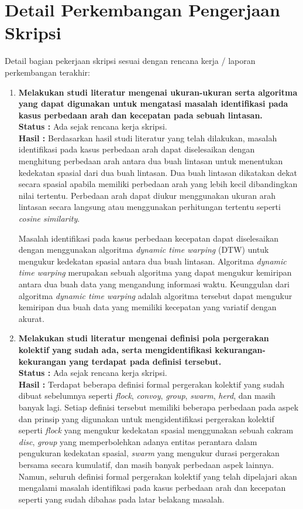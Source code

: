 \documentclass[a4paper,twoside]{article}
\begin{document}
\section{Detail Perkembangan Pengerjaan Skripsi}
Detail bagian pekerjaan skripsi sesuai dengan rencana kerja / laporan perkembangan terakhir:
	\begin{enumerate}
		\item \textbf{Melakukan studi literatur mengenai ukuran-ukuran serta algoritma yang dapat digunakan untuk mengatasi masalah identifikasi pada kasus perbedaan arah dan kecepatan pada sebuah lintasan.} \\
		{\bf Status :} Ada sejak rencana kerja skripsi.\\
		{\bf Hasil :} Berdasarkan hasil studi literatur yang telah dilakukan, masalah identifikasi pada kasus perbedaan arah dapat diselesaikan dengan menghitung perbedaan arah antara dua buah lintasan untuk menentukan kedekatan spasial dari dua buah lintasan. Dua buah lintasan dikatakan dekat secara spasial apabila memiliki perbedaan arah yang lebih kecil dibandingkan nilai tertentu. Perbedaan arah dapat diukur menggunakan ukuran arah lintasan secara langsung atau menggunakan perhitungan tertentu seperti \textit{cosine similarity}.
		
		Masalah identifikasi pada kasus perbedaan kecepatan dapat diselesaikan dengan menggunakan algoritma \textit{dynamic time warping} (DTW) untuk mengukur kedekatan spasial antara dua buah lintasan. Algoritma \textit{dynamic time warping} merupakan sebuah algoritma yang dapat mengukur kemiripan antara dua buah data yang mengandung informasi waktu. Keunggulan dari algoritma \textit{dynamic time warping} adalah algoritma tersebut dapat mengukur kemiripan dua buah data yang memiliki kecepatan yang variatif dengan akurat.
		\\
		
		\item \textbf{Melakukan studi literatur mengenai definisi pola pergerakan kolektif yang sudah ada, serta mengidentifikasi kekurangan-kekurangan yang terdapat pada definisi tersebut.}\\
		{\bf Status :} Ada sejak rencana kerja skripsi.\\
		{\bf Hasil :} Terdapat beberapa definisi formal pergerakan kolektif yang sudah dibuat sebelumnya seperti \textit{flock}, \textit{convoy}, \textit{group}, \textit{swarm}, \textit{herd}, dan masih banyak lagi. Setiap definisi tersebut memiliki beberapa perbedaan pada aspek dan prinsip yang digunakan untuk mengidentifikasi pergerakan kolektif seperti \textit{flock} yang mengukur kedekatan spasial menggunakan sebuah cakram \textit{disc}, \textit{group} yang memperbolehkan adanya entitas perantara dalam pengukuran kedekatan spasial, \textit{swarm} yang mengukur durasi pergerakan bersama secara kumulatif, dan masih banyak perbedaan aspek lainnya. Namun, seluruh definisi formal pergerakan kolektif yang telah dipelajari akan mengalami masalah identifikasi pada kasus perbedaan arah dan kecepatan seperti yang sudah dibahas pada latar belakang masalah. \\


\end{enumerate}
\end{document}
